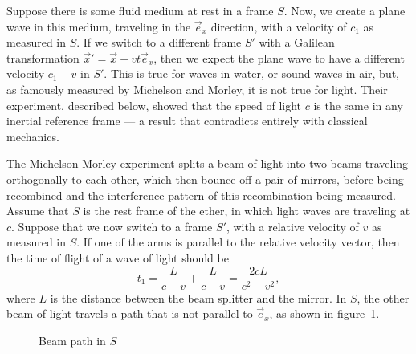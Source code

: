

Suppose there is some fluid medium at rest in a frame $S$.
Now, we create a plane wave in this medium, traveling in the $\vec{e}_x$
direction, with a velocity of $c_1$ as measured in $S$.
If we switch to a different frame $S'$ with a Galilean transformation $\vec{x}'
= \vec{x} + v t \vec{e}_x$, then we expect the plane wave to have a different
velocity $c_1 - v$ in $S'$.
This is true for waves in water, or sound waves in air, but, as famously
measured by Michelson and Morley, it is not true for light.
Their experiment, described below, showed that the speed of light $c$ is the
same in any inertial reference frame --- a result that contradicts entirely with
classical mechanics.

The Michelson-Morley experiment splits a beam of light into two beams traveling
orthogonally to each other, which then bounce off a pair of mirrors, before
being recombined and the interference pattern of this recombination being
measured.
Assume that $S$ is the rest frame of the ether, in which light waves are
traveling at $c$.
Suppose that we now switch to a frame $S'$, with a relative velocity of $v$ as
measured in $S$.
If one of the arms is parallel to the relative velocity vector, then the time of
flight of a wave of light should be
\[
  t_1 = \frac{L}{c + v} + \frac{L}{c-v} = \frac{2 c L}{c^2 - v^2},
\]
where $L$ is the distance between the beam splitter and the mirror.
In $S$, the other beam of light travels a path that is not parallel to
$\vec{e}_x$, as shown in figure~\ref{fig:michelson-morley-beam-path}.

\begin{figure}[h!]
  \centering
  \caption{Beam path in $S$}%
  \label{fig:michelson-morley-beam-path}
\end{figure}


